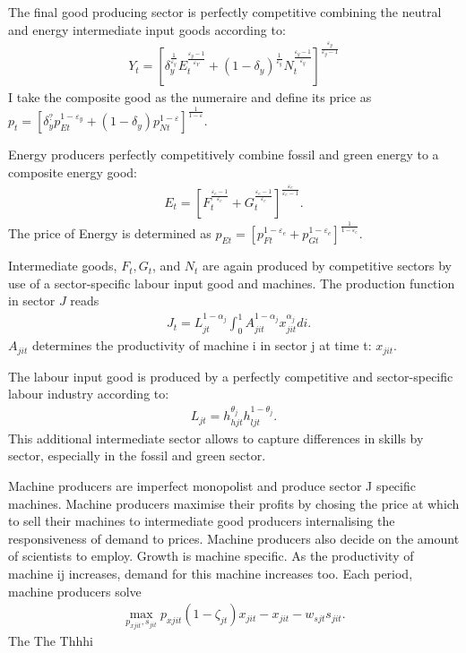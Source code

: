 The final good producing sector is perfectly competitive combining the neutral and energy intermediate input goods according to:
\begin{align}
Y_t=\left[\delta_y^\frac{1}{\varepsilon_y}E_{t}^{\frac{\varepsilon_y-1}{\varepsilon_Y}}+(1-\delta_y)^\frac{1}{\varepsilon_y}N_{t}^{\frac{\varepsilon_y-1}{\varepsilon_y}}\right]^\frac{\varepsilon_y}{\varepsilon_y-1}
\end{align} 
I take the composite good as the numeraire and define its price as $p_t=\left[\delta_y^?p_{Et}^{1-\varepsilon_y}+(1-\delta_y)p_{Nt}^{1-\varepsilon}\right]^{\frac{1}{1-\varepsilon}}$.

Energy producers perfectly competitively combine fossil and green energy to a composite energy good:
\begin{align}
E_t=\left[F_t^\frac{\varepsilon_e-1}{\varepsilon_e}+G_t^\frac{\varepsilon_e-1}{\varepsilon_e}\right]^\frac{\varepsilon_e}{\varepsilon_e-1}.
\end{align}
The price of Energy is determined as  $p_{Et}= \left[p_{Ft}^{1-\varepsilon_e}+p_{Gt}^{1-\varepsilon_e}\right]^\frac{1}{{1-\varepsilon_e}}$.

Intermediate goods, $F_t, G_t$, and $N_t$ are again produced by competitive sectors by use of a sector-specific labour input good and machines. The production function in sector $J$ reads
\begin{align}
&J_{t}= L_{jt}^{1-\alpha_j}\int_{0}^{1}A_{jit}^{1-\alpha_j}x_{jit}^{\alpha_j} di.
\end{align}
$A_{jit}$ determines the productivity of machine i in sector j at time t: $x_{jit}$.

The labour input good is produced by a perfectly competitive and sector-specific labour industry according to: 
\begin{align}
L_{jt}=h_{hjt}^{\theta_j}h_{ljt}^{1-\theta_j}.
\end{align}
This additional intermediate sector allows to capture differences in skills by sector, especially in the fossil and green sector.

Machine producers are imperfect monopolist and produce sector J specific machines. Machine producers maximise their profits by chosing the price at which to sell their machines to intermediate good producers internalising the responsiveness of demand to prices. Machine producers also decide on the amount of scientists to employ. Growth is machine specific. As the productivity of machine ij increases, demand for this machine increases too. 
Each period, machine producers solve
\begin{align}
\underset{p_{xjit}, s_{jit}}{\max}p_{xjit}(1-\zeta_{jt})x_{jit}-x_{jit}-w_{sjt}s_{jit}.
\end{align}
The 
The Thhhi
